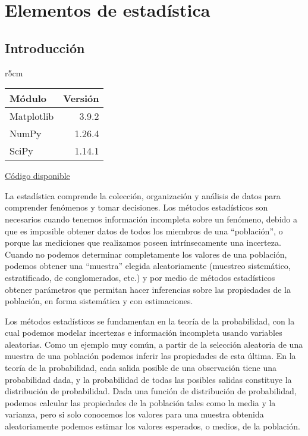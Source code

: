 

\chapter{Elementos de estadística} \label{ch:estadistica}


\section{Introducción}

\begin{wraptable}{r}{5cm}
\begin{modulesinfo}
\begin{center}
{\small
    \begin{tabular}{l r}
        \toprule
        \textbf{Módulo} & \textbf{Versión} \\
        \midrule
        Matplotlib & 3.9.2 \\
        NumPy & 1.26.4 \\
        SciPy & 1.14.1 \\
        \bottomrule
    \end{tabular}
    \vspace{0.75em}

    \href{https://github.com/facundobatista/libro-pyciencia/tree/master/código/estadistica/}{Código disponible}
}
\end{center}
\end{modulesinfo}
\end{wraptable}

La estadística comprende la colección, organización y análisis de datos para comprender fenómenos y tomar decisiones. Los métodos estadísticos son necesarios cuando tenemos información incompleta sobre un fenómeno, debido a que es imposible obtener datos de todos los miembros de una ``población'', o porque las mediciones que realizamos poseen intrínsecamente una incerteza. Cuando no podemos determinar completamente los valores de una población, podemos obtener una ``muestra'' elegida aleatoriamente (muestreo sistemático, estratificado, de conglomerados, etc.) y por medio de métodos estadísticos obtener parámetros que permitan hacer inferencias sobre las propiedades de la población, en forma sistemática y con estimaciones.

Los métodos estadísticos se fundamentan en la teoría de la probabilidad, con la cual podemos modelar incertezas e información incompleta usando variables aleatorias. Como un ejemplo muy común, a partir de la selección aleatoria de una muestra de una población podemos inferir las propiedades de esta última. En la teoría de la probabilidad, cada salida posible de una observación tiene una probabilidad dada, y la probabilidad de todas las posibles salidas constituye la distribución de probabilidad. Dada una función de distribución de probabilidad, podemos calcular las propiedades de la población tales como la media y la varianza, pero si solo conocemos los valores para una muestra obtenida aleatoriamente  podemos estimar los valores esperados, o medios, de la población.

